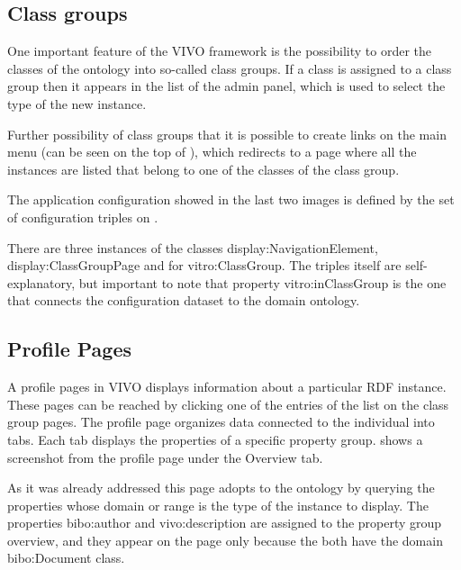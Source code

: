 \subsection{Class groups}

One important feature of the VIVO framework is the possibility to order the classes of the ontology into so-called class groups. If a class is assigned to a class group then it appears in the list of the admin panel, which is used to select the type of the new instance.


Further possibility of class groups that it is possible to create links on the main menu (can be seen on the top of ), which redirects to a page where all the instances are listed that belong to one of the classes of the class group.


The application configuration showed in the last two images is  defined by the set of configuration triples on .


There are three instances of the classes display:NavigationElement, display:ClassGroupPage and for vitro:ClassGroup. The triples itself are self-explanatory, but important to note that property vitro:inClassGroup is the one that connects the configuration dataset to the domain ontology.  

\subsection{Profile Pages}

A profile pages in VIVO displays information about a particular RDF instance. These pages can be reached by clicking one of the entries of the list on the class group pages. The profile page organizes data connected to the individual into tabs. Each tab displays the properties of a specific property group.  shows a screenshot from the profile page under the Overview tab.


As it was already addressed this page adopts to the ontology by querying the properties whose domain or range is the type of the instance to display.  The properties bibo:author and vivo:description are assigned to the property group overview, and they appear on the page only because the both have the domain bibo:Document class.

